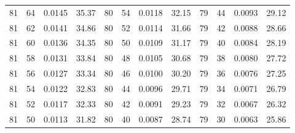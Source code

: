 \begin{tabular}{llll|llll|llll}
81 & 64 & 0.0145 & 35.37 & 80 & 54 & 0.0118 & 32.15 & 79 & 44 & 0.0093 & 29.12\\
81 & 62 & 0.0141 & 34.86 & 80 & 52 & 0.0114 & 31.66 & 79 & 42 & 0.0088 & 28.66\\
81 & 60 & 0.0136 & 34.35 & 80 & 50 & 0.0109 & 31.17 & 79 & 40 & 0.0084 & 28.19\\
81 & 58 & 0.0131 & 33.84 & 80 & 48 & 0.0105 & 30.68 & 79 & 38 & 0.0080 & 27.72\\
81 & 56 & 0.0127 & 33.34 & 80 & 46 & 0.0100 & 30.20 & 79 & 36 & 0.0076 & 27.25\\
81 & 54 & 0.0122 & 32.83 & 80 & 44 & 0.0096 & 29.71 & 79 & 34 & 0.0071 & 26.79\\
81 & 52 & 0.0117 & 32.33 & 80 & 42 & 0.0091 & 29.23 & 79 & 32 & 0.0067 & 26.32\\
81 & 50 & 0.0113 & 31.82 & 80 & 40 & 0.0087 & 28.74 & 79 & 30 & 0.0063 & 25.86\\
\bottomrule
\end{tabular}
\newpage
